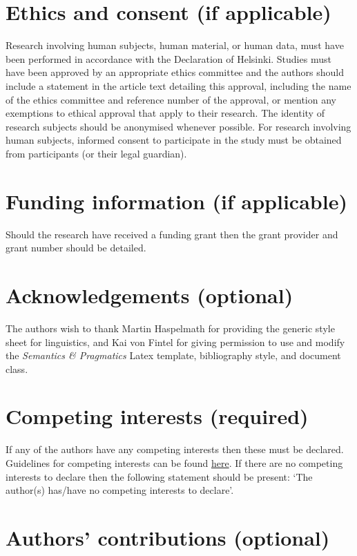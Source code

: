 \documentclass[times,linguex,xcolor]{glossa}
\begin{document}
\section*{Ethics and consent (if applicable)}

Research involving human subjects, human material, or human data, must have been performed in accordance with the Declaration of Helsinki. Studies must have been approved by an appropriate ethics committee and the authors should include a statement in the article text detailing this approval, including the name of the ethics committee and reference number of the approval, or mention any exemptions to ethical approval that apply to their research. The identity of research subjects should be anonymised whenever possible. For research involving human subjects, informed consent to participate in the study must be obtained from participants (or their legal guardian).


\section*{Funding information (if applicable)}

Should the research have received a funding grant then the grant provider and grant number should be detailed.

\section*{Acknowledgements (optional)}

The authors wish to thank Martin Haspelmath for providing the generic style sheet for linguistics, and Kai von Fintel for giving permission to use and modify the \textit{Semantics \& Pragmatics} Latex template, bibliography style, and document class.

\section*{Competing interests (required)}

If any of the authors have any competing interests then these must be declared. Guidelines for competing interests can be found \href{https://www.glossa-journal.org/site/competing-interests/}{here}. If there are no competing interests to declare then the following statement should be present: `The author(s) has/have no competing interests to declare'.

\section*{Authors' contributions (optional)}\label{contrib}
\end{document}
